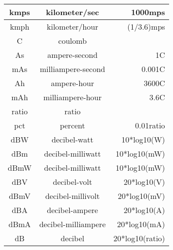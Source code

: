 \begin{longtable}{|c|c|r|}
  kmps & kilometer/sec & 1000mps \\\hline
  kmph & kilometer/hour & (1/3.6)mps \\\hline
  C & coulomb & \\\hline
  As & ampere-second & 1C \\\hline
  mAs & milliampere-second & 0.001C \\\hline
  Ah & ampere-hour & 3600C \\\hline
  mAh & milliampere-hour & 3.6C \\\hline
  ratio & ratio & \\\hline
  pct & percent & 0.01ratio \\\hline
  dBW & decibel-watt & 10*log10(W) \\\hline
  dBm & decibel-milliwatt & 10*log10(mW) \\\hline
  dBmW & decibel-milliwatt & 10*log10(mW) \\\hline
  dBV & decibel-volt & 20*log10(V) \\\hline
  dBmV & decibel-millivolt & 20*log10(mV) \\\hline
  dBA & decibel-ampere & 20*log10(A) \\\hline
  dBmA & decibel-milliampere & 20*log10(mA) \\\hline
  dB & decibel & 20*log10(ratio) \\\hline
\end{longtable}



